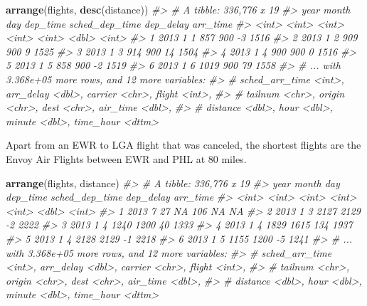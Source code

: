 \documentclass[]{book}
\newenvironment{Shaded}{\begin{snugshade}}{\end{snugshade}}
\newcommand{\CommentTok}[1]{\textcolor[rgb]{0.56,0.35,0.01}{\textit{#1}}}
\newcommand{\KeywordTok}[1]{\textcolor[rgb]{0.13,0.29,0.53}{\textbf{#1}}}
\newcommand{\NormalTok}[1]{#1}
\theoremstyle{plain}
\theoremstyle{remark}
\theoremstyle{definition}
\theoremstyle{definition}
\theoremstyle{definition}
\theoremstyle{remark}
\begin{document}
\begin{Shaded}
\begin{Highlighting}[]
\KeywordTok{arrange}\NormalTok{(flights, }\KeywordTok{desc}\NormalTok{(distance))}
\CommentTok{#> # A tibble: 336,776 x 19}
\CommentTok{#>    year month   day dep_time sched_dep_time dep_delay arr_time}
\CommentTok{#>   <int> <int> <int>    <int>          <int>     <dbl>    <int>}
\CommentTok{#> 1  2013     1     1      857            900        -3     1516}
\CommentTok{#> 2  2013     1     2      909            900         9     1525}
\CommentTok{#> 3  2013     1     3      914            900        14     1504}
\CommentTok{#> 4  2013     1     4      900            900         0     1516}
\CommentTok{#> 5  2013     1     5      858            900        -2     1519}
\CommentTok{#> 6  2013     1     6     1019            900        79     1558}
\CommentTok{#> # ... with 3.368e+05 more rows, and 12 more variables:}
\CommentTok{#> #   sched_arr_time <int>, arr_delay <dbl>, carrier <chr>, flight <int>,}
\CommentTok{#> #   tailnum <chr>, origin <chr>, dest <chr>, air_time <dbl>,}
\CommentTok{#> #   distance <dbl>, hour <dbl>, minute <dbl>, time_hour <dttm>}
\end{Highlighting}
\end{Shaded}

Apart from an EWR to LGA flight that was canceled, the shortest flights
are the Envoy Air Flights between EWR and PHL at 80 miles.

\begin{Shaded}
\begin{Highlighting}[]
\KeywordTok{arrange}\NormalTok{(flights, distance)}
\CommentTok{#> # A tibble: 336,776 x 19}
\CommentTok{#>    year month   day dep_time sched_dep_time dep_delay arr_time}
\CommentTok{#>   <int> <int> <int>    <int>          <int>     <dbl>    <int>}
\CommentTok{#> 1  2013     7    27       NA            106        NA       NA}
\CommentTok{#> 2  2013     1     3     2127           2129        -2     2222}
\CommentTok{#> 3  2013     1     4     1240           1200        40     1333}
\CommentTok{#> 4  2013     1     4     1829           1615       134     1937}
\CommentTok{#> 5  2013     1     4     2128           2129        -1     2218}
\CommentTok{#> 6  2013     1     5     1155           1200        -5     1241}
\CommentTok{#> # ... with 3.368e+05 more rows, and 12 more variables:}
\CommentTok{#> #   sched_arr_time <int>, arr_delay <dbl>, carrier <chr>, flight <int>,}
\CommentTok{#> #   tailnum <chr>, origin <chr>, dest <chr>, air_time <dbl>,}
\CommentTok{#> #   distance <dbl>, hour <dbl>, minute <dbl>, time_hour <dttm>}
\end{Highlighting}
\end{Shaded}
\end{document}
